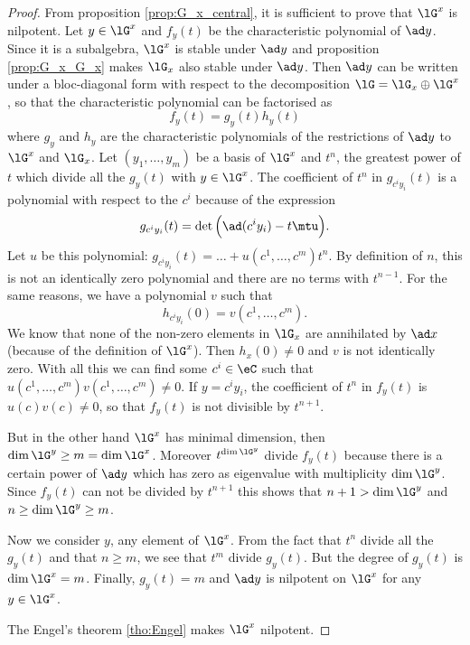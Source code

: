\begin{proof}
From proposition \ref{prop:G_x_central}, it is sufficient to prove that $\lG^x$ is nilpotent. Let $y\in\lG^x$ and $f_y(t)$ be the characteristic polynomial of $\ad y$. Since it is a subalgebra, $\lG^x$ is stable under $\ad y$ and proposition \ref{prop:G_x_G_x} makes $\lG_x$ also stable under $\ad y$. Then $\ad y$ can be written under a bloc-diagonal form with respect to the decomposition $\lG=\lG_x\oplus\lG^x$, so that the characteristic polynomial can be factorised as
\begin{equation} 
f_y(t)=g_y(t)h_y(t)
\end{equation}
where $g_y$ and $h_y$ are the characteristic polynomials of the restrictions of $\ad y$ to $\lG^x$ and $\lG_x$. Let $(y_1,\ldots,y_m)$ be a basis of $\lG^x$ and $t^n$, the greatest power of $t$ which divide all the $g_y(t)$ with $y\in\lG^x$. The coefficient of $t^n$ in $g_{c^iy_i}(t)$ is a polynomial with respect to the $c^i$ because of the expression 
\[
g_{c^iy_i}(t)=\det\Big( \ad(c^iy_i)-t\mtu \Big).
\]
Let $u$ be this polynomial: $g_{c^iy_i}(t)=\ldots+u(c^1,\ldots,c^m)t^n$. By definition of $n$, this is not an identically zero polynomial and there are no terms with $t^{n-1}$. For the same reasons, we have a polynomial $v$ such that
\begin{equation}
h_{c^iy_i}(0)=v(c^1,\ldots,c^m).
\end{equation}
We know that none of the non-zero elements in $\lG_x$ are annihilated by $\ad x$ (because of the definition of $\lG^x$). Then $h_x(0)\neq 0$ and $v$ is not identically zero. With all this we can find some $c^i\in\eC$ such that $u(c^1,\ldots,c^m)v(c^1,\ldots,c^m)\neq 0$. If $y=c^iy_i$, the coefficient of $t^n$ in $f_y(t)$ is $u(c)v(c)\neq 0$, so that $f_y(t)$ is not divisible by $t^{n+1}$.

But in the other hand $\lG^x$ has minimal dimension, then $\dim\lG^y\geq m=\dim\lG^x$. Moreover $t^{\dim\lG^y}$ divide $f_y(t)$ because there is a certain power of $\ad y$ which has zero as eigenvalue with multiplicity $\dim\lG^y$. Since $f_y(t)$ can not be divided by $t^{n+1}$ this shows that $n+1>\dim\lG^y$ and $n\geq\dim\lG^y\geq m$.

Now we consider $y$, any element of $\lG^x$. From the fact that $t^n$ divide all the $g_y(t)$ and that $n\geq m$, we see that $t^m$ divide $g_y(t)$. But the degree of $g_y(t)$ is $\dim\lG^x=m$. Finally, $g_y(t)=m$ and $\ad y$ is nilpotent on $\lG^x$ for any $y\in\lG^x$.

The Engel's theorem  \ref{tho:Engel} makes $\lG^x$ nilpotent.
\end{proof}


